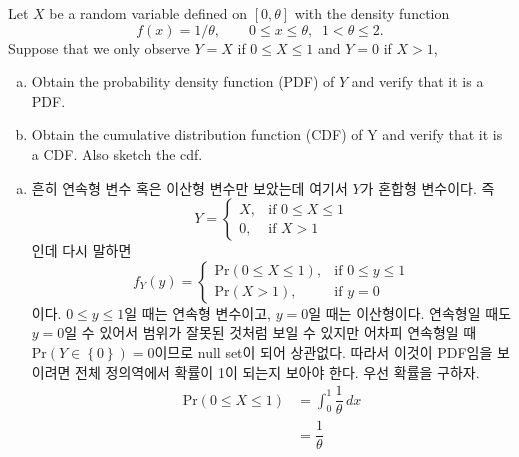 \documentclass[answers]{exam}
\begin{document}
\newpage
{}
\begin{questions}
   \question
   Let $X$ be a random variable defined on $[0,\theta]$ with the density function
   $$
    f\left(x\right)=1/\theta,\qquad 0\leq x\leq \theta,\;\; 1<\theta \leq 2.
   $$
   Suppose that we only observe $Y=X$ if $0\leq X\leq 1$ and $Y=0$ if $X>1$,
   \begin{enumerate}[(a)]
    \item Obtain the probability density function (PDF) of $Y$ and verify that it is a PDF.
    \item Obtain the cumulative distribution function (CDF) of Y and verify that it is a CDF. Also sketch the cdf.
   \end{enumerate}
   \begin{solution}
    \begin{enumerate}[(a)]
      \item 흔히 연속형 변수 혹은 이산형 변수만 보았는데 여기서 $Y$가 혼합형 변수이다. 즉
      \begin{equation}
        Y=\begin{cases}X,&\text{if $0\leq X\leq 1$}\\0,&\text{if $X>1$}  \end{cases}
      \end{equation}
      인데 다시 말하면
      \begin{equation}
        f_{Y}\left(y\right)=\begin{cases}\mathrm{Pr}\left(0\leq X\leq 1\right),&\text{if $0\leq y\leq 1$}\\ \mathrm{Pr}\left(X>1\right),&\text{if $y=0$} \end{cases}
      \end{equation}
      이다. $0\leq y\leq 1$일 때는 연속형 변수이고, $y=0$일 때는 이산형이다. 연속형일 때도 $y=0$일 수 있어서 범위가 잘못된 것처럼 보일 수 있지만 어차피 연속형일 때 $\mathrm{Pr}\left(Y\in\left\{0\right\}\right)=0$이므로 null set이 되어 상관없다. 따라서 이것이 PDF임을 보이려면 전체 정의역에서 확률이 1이 되는지 보아야 한다. 우선 확률을 구하자.
      \begin{align}
        \mathrm{Pr}\left(0\leq X\leq 1\right) &= \int_{0}^{1}\dfrac{1}{\theta}\,dx\\
        &= \dfrac{1}{\theta}\\

\end{align}
\end{enumerate}
\end{solution}
\end{questions}
\end{document}
